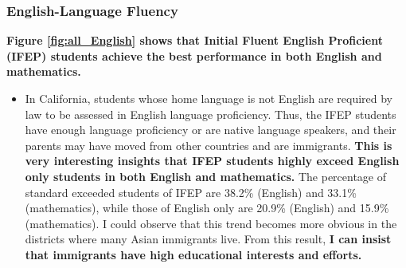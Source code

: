 \documentclass[11pt]{article}
\begin{document}
\subsubsection{English-Language Fluency}
\textbf{Figure \ref{fig:all_English} shows that Initial Fluent English Proficient (IFEP) students achieve the best performance in both English and mathematics.}

\begin{itemize}
	\item In California, students whose home language is not English are required by law to be assessed in English language proficiency. Thus, the IFEP students have enough language proficiency or are native language speakers, and their parents may have moved from other countries and are immigrants. \textbf{This is very interesting insights that IFEP students highly exceed English only students in both English and mathematics.} The percentage of standard exceeded students of IFEP are 38.2\% (English) and 33.1\% (mathematics), while those of English only are 20.9\% (English) and 15.9\% (mathematics). I could observe that this trend becomes more obvious in the districts where many Asian immigrants live. From this result, \textbf{I can insist that immigrants have high educational interests and efforts.}  
\end{itemize}
\end{document}
